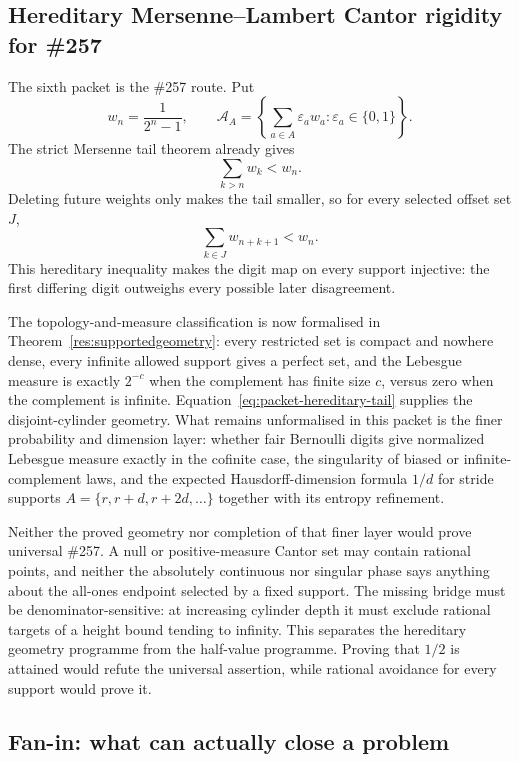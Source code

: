 \documentclass[11pt]{article}
\theoremstyle{definition}
\theoremstyle{remark}
\begin{document}
\subsection{Hereditary Mersenne--Lambert Cantor rigidity for \#257}
\label{sec:packet-mersenne-cantor}

The sixth packet is the \#257 route.  Put
\[
 w_n=\frac1{2^n-1},
 \qquad
 \mathcal A_A=
 \left\{\sum_{a\in A}\varepsilon_a w_a:
 \varepsilon_a\in\{0,1\}\right\}.
\]
The strict Mersenne tail theorem already gives
\[
 \sum_{k>n}w_k<w_n.
\]
Deleting future weights only makes the tail smaller, so for every selected
offset set $J$,
\[
 \sum_{k\in J}w_{n+k+1}<w_n.
 \tag{H}\label{eq:packet-hereditary-tail}
\]
This hereditary inequality makes the digit map on every support injective:
the first differing digit outweighs every possible later disagreement.

The topology-and-measure classification is now formalised in
Theorem~\ref{res:supportedgeometry}: every restricted set is compact and
nowhere dense, every infinite allowed support gives a perfect set, and the
Lebesgue measure is exactly \(2^{-c}\) when the complement has finite size
\(c\), versus zero when the complement is infinite.
Equation~\eqref{eq:packet-hereditary-tail} supplies the disjoint-cylinder
geometry.  What remains unformalised in this packet is the finer probability
and dimension layer: whether fair Bernoulli digits give normalized Lebesgue
measure exactly in the cofinite case, the singularity of biased or
infinite-complement laws, and the expected Hausdorff-dimension formula
\(1/d\) for stride supports \(A=\{r,r+d,r+2d,\ldots\}\) together with its
entropy refinement.

Neither the proved geometry nor completion of that finer layer would prove
universal \#257.  A null or
positive-measure Cantor set may contain rational points, and neither the
absolutely continuous nor singular phase says anything about the all-ones
endpoint selected by a fixed support.  The missing bridge must be
denominator-sensitive: at increasing cylinder depth it must exclude rational
targets of a height bound tending to infinity.  This separates the hereditary
geometry programme from the half-value programme.  Proving that $1/2$ is
attained would refute the universal assertion, while rational avoidance for
every support would prove it.

\subsection{Fan-in: what can actually close a problem}
\label{sec:packet-fanin}
\end{document}
